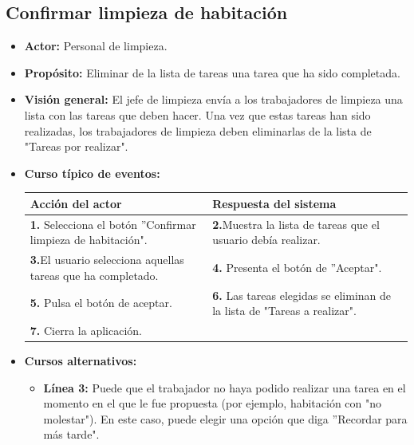 \documentclass[spanish,a4paper,12pt]{report}	%
\begin{document}
		\subsection{Confirmar limpieza de habitación}
			\begin{itemize}
			\item \textbf{Actor: } Personal de limpieza.
			\item \textbf{Propósito: }Eliminar de la lista de tareas una tarea que ha sido completada.
			\item \textbf{Visión general: }El jefe de limpieza envía a los trabajadores de limpieza una lista con las tareas que deben hacer. Una vez que estas tareas han sido realizadas, los trabajadores de limpieza deben eliminarlas de la lista de "Tareas por realizar".
			\item \textbf{Curso típico de eventos:}\\ 	%
				\begin{tabular}{|p{6cm}||p{6cm}|}
					\hline
					\textbf{Acción del actor} & \textbf{Respuesta del sistema} \\ \hline \hline
					\textbf{1.} Selecciona el botón  ''Confirmar limpieza de habitación". & \textbf{2.}Muestra la lista de tareas que el usuario debía realizar.\\ \hline 
					\textbf{3.}El usuario selecciona aquellas tareas que ha completado. & \textbf{4.} Presenta el botón de ''Aceptar".\\ \hline
					\textbf{5.} Pulsa el botón de aceptar. & \textbf{6.} Las tareas elegidas se eliminan de la lista de "Tareas a realizar". \\ \hline
					\textbf{7.} Cierra la aplicación.	& \\ \hline	
				\end{tabular}
			\item \textbf{Cursos alternativos:} 
				\begin{itemize}
					\item \textbf{Línea 3: } Puede que el trabajador no haya podido realizar una tarea en el momento en el que le fue propuesta (por ejemplo, habitación con "no molestar").
 En este caso, puede elegir una opción que diga ''Recordar para más tarde".
				\end{itemize}
		\end {itemize}%

\end{document}
